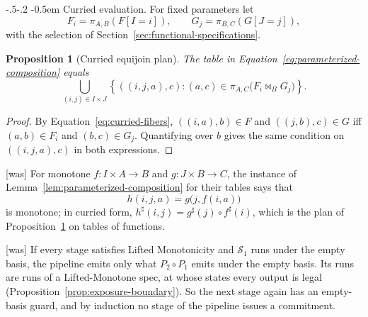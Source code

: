 \documentclass[sigconf]{cidr-2027}
\makeatletter
\newtheorem{proposition}{Proposition}
\theoremstyle{remark}
\renewcommand\paragraph{\@startsection{paragraph}{4}{\z@}%
  {-.5\baselineskip \@plus -2\p@ \@minus -.2\p@}%
  {-0.5em}%
  {\normalfont\bfseries}}
\newcommand{\commitment}{commitment\xspace}
\newcommand{\Spec}{\mathcal{S}}
\makeatother
\begin{document}
\paragraph{Curried evaluation.}
For fixed parameters let
\begin{equation}
  F_i=\pi_{A,B}(F[I=i]),
  \qquad
  G_j=\pi_{B,C}(G[J=j]),
  \label{eq:curried-fibers}
\end{equation}
with the selection of Section~\ref{sec:functional-specifications}.

\begin{proposition}[Curried equijoin plan]
\label{prop:curried-query-plan}
The table in Equation~\ref{eq:parameterized-composition} equals
\begin{equation}
  \bigcup_{(i,j)\in I\times J}
  \left\{((i,j,a),c):
    (a,c)\in\pi_{A,C}\bigl(F_i\Join_B G_j\bigr)\right\}.
  \label{eq:curried-query-plan}
\end{equation}
\end{proposition}

\begin{proof}
By Equation~\ref{eq:curried-fibers}, $((i,a),b)\in F$ and $((j,b),c)\in G$
iff $(a,b)\in F_i$ and $(b,c)\in G_j$.  Quantifying over $b$ gives the same
condition on $((i,j,a),c)$ in both expressions.
\end{proof}



{\footnotesize\color{black!50}\noindent\textsf{[was]} For monotone $f:I\times A\to B$ and $g:J\times B\to C$, the instance of
Lemma~\ref{lem:parameterized-composition} for their tables says that
\begin{equation}
  h(i,j,a)=g\bigl(j,f(i,a)\bigr)
\end{equation}
is monotone; in curried form, $h^\sharp(i,j)=g^\sharp(j)\circ f^\sharp(i)$,
which is the plan of Proposition~\ref{prop:curried-query-plan} on tables of functions.\par}



{\footnotesize\color{black!50}\noindent\textsf{[was]} If every stage satisfies Lifted Monotonicity and $\Spec_1$ runs under the
empty basis, the pipeline emits only what $P_2\circ P_1$ emits under the empty
basis.  Its runs are runs of a Lifted-Monotone
spec, at whose states every output is legal
(Proposition~\ref{prop:exposure-boundary}).  So the next stage again has an
empty-basis guard, and by induction no stage of the pipeline issues a \commitment.\par}
\end{document}
